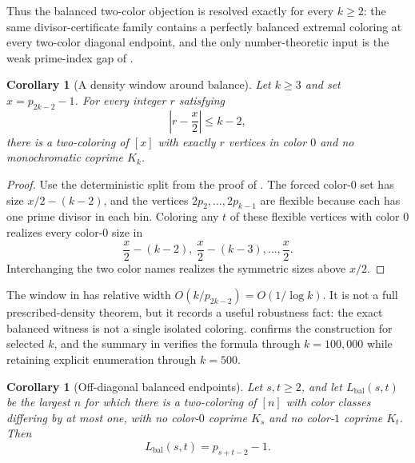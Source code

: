 \documentclass[11pt]{article}
\theoremstyle{plain}
\newtheorem{corollary}[theorem]{Corollary}
\theoremstyle{definition}
\theoremstyle{remark}
\begin{document}
Thus the balanced two-color objection is resolved exactly for every $k\ge2$:
the same divisor-certificate family contains a perfectly balanced extremal
coloring at every two-color diagonal endpoint, and the only number-theoretic
input is the weak prime-index gap of .

\begin{corollary}[A density window around balance]
\label{cor:density-window}
Let $k\ge3$ and set $x=p_{2k-2}-1$.  For every integer $r$ satisfying
\[
  \left|r-\frac{x}{2}\right|\le k-2,
\]
there is a two-coloring of $[x]$ with exactly $r$ vertices in color $0$ and no
monochromatic coprime $K_k$.
\end{corollary}

\begin{proof}
Use the deterministic split from the proof of .  The
forced color-$0$ set has size $x/2-(k-2)$, and the vertices
$2p_2,\ldots,2p_{k-1}$ are flexible because each has one prime divisor in
each bin.  Coloring any $t$ of these flexible vertices with color $0$ realizes
every color-$0$ size in
\[
  \frac{x}{2}-(k-2),\ \frac{x}{2}-(k-3),\ldots,\frac{x}{2}.
\]
Interchanging the two color names realizes the symmetric sizes above $x/2$.
\end{proof}

The window in  has relative width
$O(k/p_{2k-2})=O(1/\log k)$.  It is not a full prescribed-density theorem, but
it records a useful robustness fact: the exact balanced witness is not a
single isolated coloring.   confirms
the construction for selected $k$, and the summary in
 verifies the formula through
$k=100{,}000$ while retaining explicit enumeration through $k=500$.

\begin{corollary}[Off-diagonal balanced endpoints]
\label{cor:balanced-off-diagonal}
Let $s,t\ge2$, and let $L_{\mathrm{bal}}(s,t)$ be the largest $n$ for which
there is a two-coloring of $[n]$ with color classes differing by at most one,
with no color-$0$ coprime $K_s$ and no color-$1$ coprime $K_t$.  Then
\[
  L_{\mathrm{bal}}(s,t)=p_{s+t-2}-1 .
\]
\end{corollary}
\end{document}
